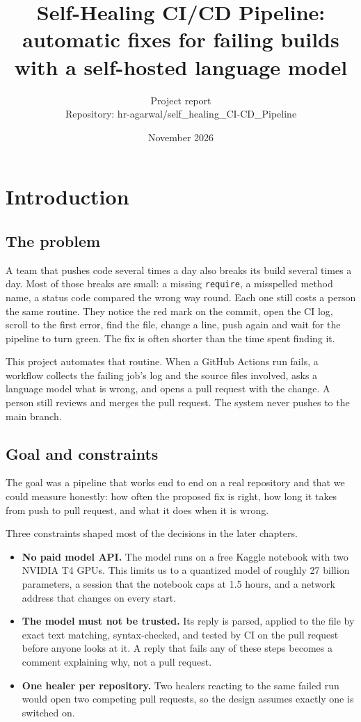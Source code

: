 \documentclass[11pt,a4paper]{report}
\title{Self-Healing CI/CD Pipeline: automatic fixes for failing builds with a self-hosted language model}
\author{Project report \\ Repository: hr-agarwal/self\_healing\_CI-CD\_Pipeline}
\date{November 2026}
\begin{document}
\maketitle

\tableofcontents
\clearpage

\chapter{Introduction}

\section{The problem}

A team that pushes code several times a day also breaks its build several times a day. Most of those breaks are small: a missing \texttt{require}, a misspelled method name, a status code compared the wrong way round. Each one still costs a person the same routine. They notice the red mark on the commit, open the CI log, scroll to the first error, find the file, change a line, push again and wait for the pipeline to turn green. The fix is often shorter than the time spent finding it.

This project automates that routine. When a GitHub Actions run fails, a workflow collects the failing job's log and the source files involved, asks a language model what is wrong, and opens a pull request with the change. A person still reviews and merges the pull request. The system never pushes to the main branch.

\section{Goal and constraints}

The goal was a pipeline that works end to end on a real repository and that we could measure honestly: how often the proposed fix is right, how long it takes from push to pull request, and what it does when it is wrong.

Three constraints shaped most of the decisions in the later chapters.

\begin{itemize}[leftmargin=*,itemsep=2pt]
\item \textbf{No paid model API.} The model runs on a free Kaggle notebook with two NVIDIA T4 GPUs. This limits us to a quantized model of roughly 27 billion parameters, a session that the notebook caps at 1.5 hours, and a network address that changes on every start.
\item \textbf{The model must not be trusted.} Its reply is parsed, applied to the file by exact text matching, syntax-checked, and tested by CI on the pull request before anyone looks at it. A reply that fails any of these steps becomes a comment explaining why, not a pull request.
\item \textbf{One healer per repository.} Two healers reacting to the same failed run would open two competing pull requests, so the design assumes exactly one is switched on.
\end{itemize}
\end{document}
